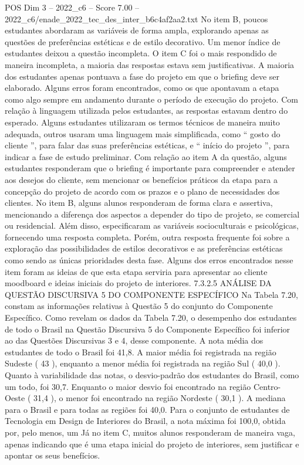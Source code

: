 \begin{textsample}{POS Dim 3 – 2022\_c6 – Score 7.00 – 2022\_c6/enade\_2022\_tec\_des\_inter\_b6c4af2aa2.txt}
No item B, poucos estudantes abordaram as variáveis de forma ampla, explorando apenas as questões de preferências estéticas e de estilo decorativo.
Um menor índice de estudantes deixou a questão incompleta.
O item C foi o mais respondido de maneira incompleta, a maioria das respostas estava sem justificativas.
A maioria dos estudantes apenas pontuava a fase do projeto em que o briefing deve ser elaborado.
Alguns erros foram encontrados, como os que apontavam a etapa como algo sempre em andamento durante o período de execução do projeto.
Com relação à linguagem utilizada pelos estudantes, as respostas estavam dentro do esperado.
Alguns estudantes utilizaram os termos técnicos de maneira muito adequada, outros usaram uma linguagem mais simplificada, como “ gosto do cliente ”, para falar das suas preferências estéticas, e “ início do projeto ”, para indicar a fase de estudo preliminar.
Com relação ao item A da questão, alguns estudantes responderam que o briefing é importante para compreender e atender aos desejos do cliente, sem mencionar os benefícios práticos da etapa para a concepção do projeto de acordo com os prazos e o plano de necessidades dos clientes.
No item B, alguns alunos responderam de forma clara e assertiva, mencionando a diferença dos aspectos a depender do tipo de projeto, se comercial ou residencial.
Além disso, especificaram as variáveis socioculturais e psicológicas, fornecendo uma resposta completa.
Porém, outra resposta frequente foi sobre a exploração das possibilidades de estilos decorativos e as preferências estéticas como sendo as únicas prioridades desta fase.
Alguns dos erros encontrados nesse item foram as ideias de que esta etapa serviria para apresentar ao cliente moodboard e ideias iniciais do projeto de interiores. 7.3.2.5 ANÁLISE DA QUESTÃO DISCURSIVA 5 DO COMPONENTE ESPECÍFICO Na Tabela 7.20, constam as informações relativas à Questão 5 do conjunto do Componente Específico.
Como revelam os dados da Tabela 7.20, o desempenho dos estudantes de todo o Brasil na Questão Discursiva 5 do Componente Específico foi inferior ao das Questões Discursivas 3 e 4, desse componente.
A nota média dos estudantes de todo o Brasil foi 41,8.
A maior média foi registrada na região Sudeste ( 43 ), enquanto a menor média foi registrada na região Sul ( 40,0 ).
Quanto à variabilidade das notas, o desvio-padrão dos estudantes do Brasil, como um todo, foi 30,7.
Enquanto o maior desvio foi encontrado na região Centro-Oeste ( 31,4 ), o menor foi encontrado na região Nordeste ( 30,1 ).
A mediana para o Brasil e para todas as regiões foi 40,0.
Para o conjunto de estudantes de Tecnologia em Design de Interiores do Brasil, a nota máxima foi 100,0, obtida por, pelo menos, um Já no item C, muitos alunos responderam de maneira vaga, apenas indicando que é uma etapa inicial do projeto de interiores, sem justificar e apontar os seus benefícios.

\end{textsample}
